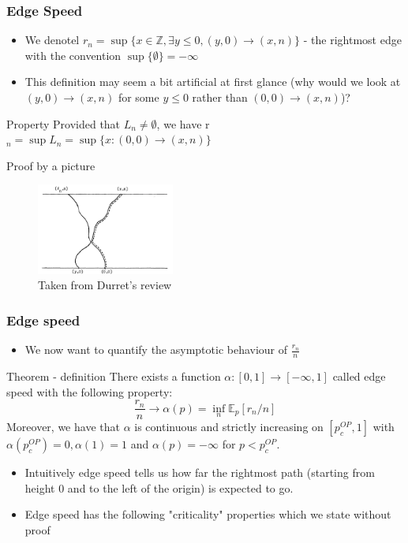 \begin{frame}
	\frametitle{Edge Speed}
	\begin{itemize}
		\item We denotel $r_{n} = \sup \{x \in \mathbb{Z}, \exists y \leq 0, (y, 0) \rightarrow (x, n)\}$ - the rightmost edge with the convention $\sup \{\emptyset\} = - \infty$
		\item This definition may seem a bit artificial at first glance (why would we look at $(y, 0) \rightarrow (x, n)$ for some $y \leq 0$ rather than $(0, 0) \rightarrow (x, n)$)?
	\end{itemize}
	\begin{block}{Property}
		Provided that $L_{n} \neq \emptyset$, we have r$_{n} = \sup L_{n} = \sup \{x: (0, 0) \rightarrow (x, n) \} $
	\end{block}
	\begin{block}{Proof by a picture}
		\begin{figure}
			\caption{Taken from Durret's review}
			\includegraphics[height = 3cm]{image_edge_speed}
			\centering
		\end{figure}
	\end{block}
\end{frame}

\begin{frame}
	\frametitle{Edge speed}
	\begin{itemize}
		\item We now want to quantify the asymptotic behaviour of $\frac{r_{n}}{n}$
	\end{itemize}
	\begin{block}{Theorem - definition}
		There exists a function $\alpha: [0, 1] \rightarrow [- \infty, 1]$ called edge speed with the following property:
		$$
			\frac{r_{n}}{n} \rightarrow \alpha (p) = \inf_{n} \mathbb{E}_{p}[r_{n}/n]
		$$
		Moreover, we have that $\alpha$ is continuous and strictly increasing on $[p_{c}^{OP}, 1]$ with $\alpha(p_{c}^{OP}) = 0, \alpha(1) = 1$ and $\alpha(p) = -\infty$ for $p < p_{c}^{OP}$.
	\end{block}
	\begin{itemize}
		\item Intuitively edge speed tells us how far the rightmost path (starting from height 0 and to the left of the origin) is expected to go.
		\item Edge speed has the following "criticality" properties which we state without proof
	\end{itemize}

\end{frame}

